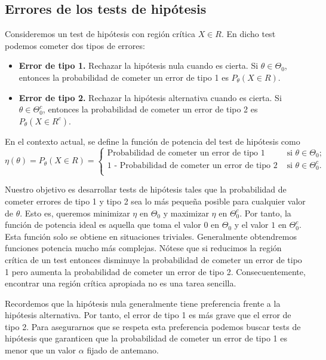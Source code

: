     \subsection{Errores de los tests de hipótesis}


    Consideremos un test de hipótesis con región crítica $X \in R$. En dicho test podemos cometer dos tipos de errores:

    \begin{itemize}
        \item \textbf{Error de tipo 1.} Rechazar la hipótesis nula cuando es cierta. Si $\theta \in \Theta_0$, entonces la probabilidad de cometer un error de tipo 1 es $P_\theta(X \in R)$.
        \item \textbf{Error de tipo 2.} Rechazar la hipótesis alternativa cuando es cierta. Si $\theta \in \Theta_0^c$, entonces la probabilidad de cometer un error de tipo 2 es $P_\theta(X \in R^c)$.
    \end{itemize}

    \begin{definition}
        En el contexto actual, se define la función de potencia del test de hipótesis como
        \[\eta(\theta) = P_\theta(X \in R) = \begin{cases} \text{Probabilidad de cometer un error de tipo 1} & \text{ si } \theta \in \Theta_0; \\ \text{1 - Probabilidad de cometer un error de tipo 2} & \text{ si } \theta \in \Theta_0^c. \\ \end{cases}\]
    \end{definition}

    Nuestro objetivo es desarrollar tests de hipótesis tales que la probabilidad de cometer errores de tipo 1 y tipo 2 sea lo más pequeña posible para cualquier valor de $\theta$. Esto es, queremos minimizar $\eta$ en $\Theta_0$ y maximizar $\eta$ en $\Theta_0^c$. Por tanto, la función de potencia ideal es aquella que toma el valor $0$ en $\Theta_0$ y el valor $1$ en $\Theta_0^c$. Esta función solo se obtiene en situaciones triviales. Generalmente obtendremos funciones potencia mucho más complejas. Nótese que si reducimos la región crítica de un test entonces disminuye la probabilidad de cometer un error de tipo 1 pero aumenta la probabilidad de cometer un error de tipo 2. Consecuentemente, encontrar una región crítica apropiada no es una tarea sencilla.

    Recordemos que la hipótesis nula generalmente tiene preferencia frente a la hipótesis alternativa. Por tanto, el error de tipo 1 es más grave que el error de tipo 2. Para asegurarnos que se respeta esta preferencia podemos buscar tests de hipótesis que garanticen que la probabilidad de cometer un error de tipo 1 es menor que un valor $\alpha$ fijado de antemano.


